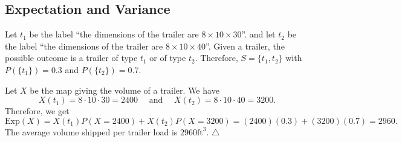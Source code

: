 \subsection{Expectation and Variance}

\begin{problem}
Let $t_1$ be the label ``the dimensions of the trailer are $8 \times 10 \times 30$''. and let $t_2$ be the label ``the dimensions of the trailer are $8 \times 10 \times 40$''. Given a trailer, the possible outcome is a trailer of type $t_1$ or of type $t_2$. Therefore, $S = \{ t_1 , t_2 \}$ with $P (\{ t_1 \}) = 0.3$ and $P (\{ t_2 \}) = 0.7$.

Let $X$ be the map giving the volume of a trailer. We have 
$$
    X (t_1) = 8 \cdot 10 \cdot 30 = 2400 \quad \text{ and } \quad X (t_2) = 8 \cdot 10 \cdot 40 = 3200 .
$$
Therefore, we get
\[
    \mathrm{Exp} (X) = X( t_1) P (X = 2400) + X (t_2) P (X = 3200) = (2400) (0.3) + (3200)(0.7) = 2960 .
\]
The average volume shipped per trailer load is $2960 \mathrm{ft}^3$. \hfill $\triangle$
\end{problem}

